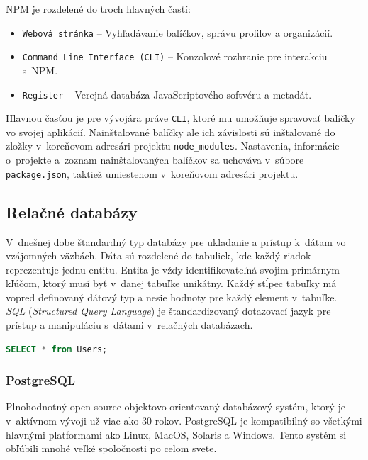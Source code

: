 \noindent NPM je rozdelené do troch hlavných častí:
\begin{itemize}
	\item \texttt{\href{https://npmjs.com/}{Webová stránka}} -- Vyhľadávanie balíčkov, správu profilov a organizácií. \cite{NPM}
	\item \texttt{Command Line Interface (CLI)} -- Konzolové rozhranie pre interakciu s~NPM. \cite{NPM}
	\item \texttt{Register} -- Verejná databáza JavaScriptového softvéru a metadát. \cite{NPM}
\end{itemize}

\noindent Hlavnou časťou je pre vývojára práve \texttt{CLI}, ktoré mu umožňuje spravovať balíčky vo svojej aplikácií. Nainštalované balíčky ale ich závislosti sú inštalované do zložky v~koreňovom adresári projektu \texttt{node\_modules}. Nastavenia, informácie o~projekte a~zoznam nainštalovaných balíčkov sa uchováva v~súbore \texttt{package.json}, taktiež umiestenom v~koreňovom adresári projektu.

\subsection{Relačné databázy}
V~dnešnej dobe štandardný typ databázy pre ukladanie a prístup k~dátam vo vzájomných väzbách. Dáta sú rozdelené do tabuliek, kde každý riadok reprezentuje jednu entitu. Entita je vždy identifikovateľná svojim primárnym kľúčom, ktorý musí byť v~danej tabuľke unikátny. Každý stĺpec tabuľky má vopred definovaný dátový typ a nesie hodnoty pre každý element v~tabuľke. \\

\noindent \emph{SQL} (\emph{Structured Query Language}) je štandardizovaný dotazovací jazyk pre prístup a manipuláciu s~dátami v~relačných databázach. \\

\begin{lstlisting}[language=SQL, caption=Príklad jednoduchého dotazu v~jazyku SQL.]
	SELECT * from Users;
\end{lstlisting}

\subsubsection{PostgreSQL}
Plnohodnotný open-source objektovo-orientovaný databázový systém, ktorý je v~aktívnom vývoji už viac ako 30 rokov. PostgreSQL je kompatibilný so všetkými hlavnými platformami ako Linux, MacOS, Solaris a Windows. Tento systém si obľúbili mnohé veľké spoločnosti po celom svete. \cite{PostgreSQL}

